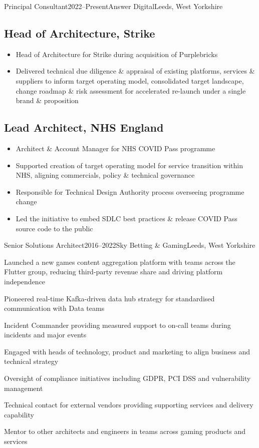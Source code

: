 \documentclass{cv}
\begin{document}
\begin{experienceplain}{Principal Consultant}{2022--Present}{Answer Digital}{Leeds, West Yorkshire}
\subsection{Head of Architecture, Strike}
\begin{itemize}
\item Head of Architecture for Strike during acquisition of Purplebricks
\item Delivered technical due diligence \& appraisal of existing platforms, services \& suppliers
      to inform target operating model, consolidated target landscape, change roadmap \& risk
      assessment for accelerated re-launch under a single brand \& proposition
\end{itemize}

\subsection{Lead Architect, NHS England}
\begin{itemize}
\item Architect \& Account Manager for NHS COVID Pass programme
\item Supported creation of target operating model for service transition within NHS, aligning
      commercials, policy \& technical governance
\item Responsible for Technical Design Authority process overseeing programme change
\item Led the initiative to embed SDLC best practices \& release COVID Pass source code to
      the public
\end{itemize}
\end{experienceplain}


\begin{experience}{Senior Solutions Architect}{2016--2022}{Sky Betting \& Gaming}{Leeds, West Yorkshire}
\item Launched a new games content aggregation platform with teams across the Flutter group, reducing
      third-party revenue share and driving platform independence
\item Pioneered real-time Kafka-driven data hub strategy for standardised communication with Data teams
\item Incident Commander providing measured support to on-call teams during incidents and major events
\item Engaged with heads of technology, product and marketing to align business and technical strategy
\item Oversight of compliance initiatives including GDPR, PCI DSS and vulnerability management
\item Technical contact for external vendors providing supporting services and delivery capability
\item Mentor to other architects and engineers in teams across gaming products and services
\end{experience}
\end{document}
